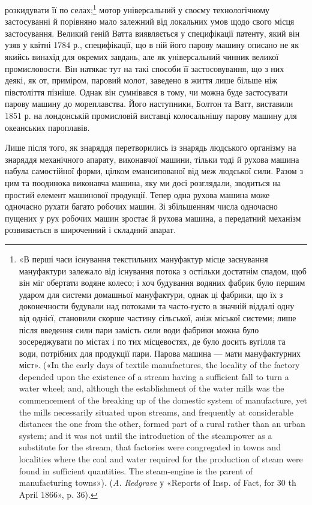 розкидувати її по селах;\footnote{
«В перші часи існування текстильних мануфактур місце заснування
мануфактури залежало від існування потока з остільки достатнім
спадом, щоб він міг обертати водяне колесо; і хоч будування водяних
фабрик було першим ударом для системи домашньої мануфактури, однак
ці фабрики, що їх з доконечности будували над потоками та часто-густо
в значній віддалі одну від однієї, становили скорше частину сільської, аніж
міської системи; лише після введення сили пари замість сили води фабрики
можна було зосереджувати по містах і по тих місцевостях, де було досить
вугілля та води, потрібних для продукції пари. Парова машина — мати
мануфактурних міст». («In the early days of textile manufactures, the locality
of the factory depended upon the existence of a stream having a sufficient
fall to turn a water wheel; and, although the establishment of the water
mills was the commencement of the breaking up of the domestic system of
manufacture, yet the mills necessarily situated upon streams, and frequently
at considerable distances the one from the other, formed part of a rural rather
than an urban system; and it was not until the introduction of the steampower
as a substitute for the stream, that factories were congregated in towns and
localities where the coal and water required for the production of steam were
found in sufficient quantities. The steam-engine is the parent of manufacturing
towns»). (\emph{A. Redgrave} у «Reports of Insp. of Fact, for 30 th
April 1866», p. 36).
} мотор універсальний у своєму технологічному
застосуванні й порівняно мало залежний від локальних
умов щодо свого місця застосування. Великий геній Ватта
виявляється у специфікації патенту, який він узяв у квітні 1784 р.,
специфікації, що в ній його парову машину описано не як якийсь
винахід для окремих завдань, але як універсальний чинник
великої промисловости. Він натякає тут на такі способи її застосовування,
що з них деякі, як от, приміром, паровий молот,
заведено в життя лише більше ніж півстоліття пізніше. Однак
він сумнівався в тому, чи можна буде застосувати парову машину
до мореплавства. Його наступники, Болтон та Ватт, виставили
1851 р. на лондонській промисловій виставці колосальнішу парову
машину для океанських пароплавів.

Лише після того, як знаряддя перетворились із знарядь людського
організму на знаряддя механічного апарату, виконавчої
машини, тільки тоді й рухова машина набула самостійної форми,
цілком емансипованої від меж людської сили. Разом з цим та
поодинока виконавча машина, яку ми досі розглядали, зводиться
на простий елемент машинової продукції. Тепер одна рухова
машина може одночасно рухати багато робочих машин. Зі збільшенням
числа одночасно пущених у рух робочих машин зростає
й рухова машина, а передатний механізм розвивається в широченний
і складний апарат.

